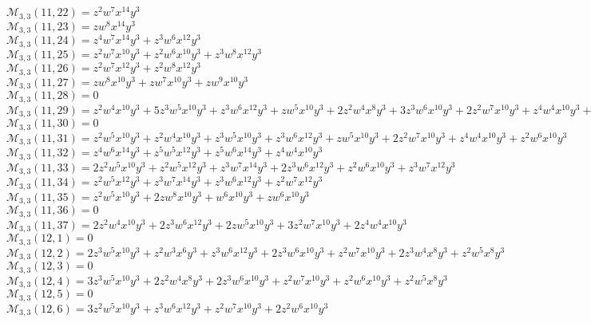 $\mathcal{M}_{3,3}(11,22)=z^2w^7x^{14}y^3$\\
$\mathcal{M}_{3,3}(11,23)=zw^8x^{14}y^3$\\
$\mathcal{M}_{3,3}(11,24)=z^4w^7x^{14}y^3+z^3w^6x^{12}y^3$\\
$\mathcal{M}_{3,3}(11,25)=z^2w^7x^{10}y^3+z^2w^6x^{10}y^3+z^3w^8x^{12}y^3$\\
$\mathcal{M}_{3,3}(11,26)=z^2w^7x^{12}y^3+z^2w^8x^{12}y^3$\\
$\mathcal{M}_{3,3}(11,27)=zw^8x^{10}y^3+zw^7x^{10}y^3+zw^9x^{10}y^3$\\
$\mathcal{M}_{3,3}(11,28)=0$\\
$\mathcal{M}_{3,3}(11,29)=z^2w^4x^{10}y^3+5z^3w^5x^{10}y^3+z^3w^6x^{12}y^3+zw^5x^{10}y^3+2z^2w^4x^8y^3+3z^3w^6x^{10}y^3+2z^2w^7x^{10}y^3+z^4w^4x^{10}y^3+z^2w^5x^8y^3$\\
$\mathcal{M}_{3,3}(11,30)=0$\\
$\mathcal{M}_{3,3}(11,31)=z^2w^5x^{10}y^3+z^2w^4x^{10}y^3+z^3w^5x^{10}y^3+z^3w^6x^{12}y^3+zw^5x^{10}y^3+2z^2w^7x^{10}y^3+z^4w^4x^{10}y^3+z^2w^6x^{10}y^3$\\
$\mathcal{M}_{3,3}(11,32)=z^4w^6x^{14}y^3+z^5w^5x^{12}y^3+z^5w^6x^{14}y^3+z^4w^4x^{10}y^3$\\
$\mathcal{M}_{3,3}(11,33)=2z^2w^5x^{10}y^3+z^2w^5x^{12}y^3+z^3w^7x^{14}y^3+2z^3w^6x^{12}y^3+z^2w^6x^{10}y^3+z^3w^7x^{12}y^3$\\
$\mathcal{M}_{3,3}(11,34)=z^2w^5x^{12}y^3+z^3w^7x^{14}y^3+z^3w^6x^{12}y^3+z^2w^7x^{12}y^3$\\
$\mathcal{M}_{3,3}(11,35)=z^2w^5x^{10}y^3+2zw^8x^{10}y^3+w^6x^{10}y^3+zw^6x^{10}y^3$\\
$\mathcal{M}_{3,3}(11,36)=0$\\
$\mathcal{M}_{3,3}(11,37)=2z^2w^4x^{10}y^3+2z^3w^6x^{12}y^3+2zw^5x^{10}y^3+3z^2w^7x^{10}y^3+2z^4w^4x^{10}y^3$\\
$\mathcal{M}_{3,3}(12,1)=0$\\
$\mathcal{M}_{3,3}(12,2)=2z^3w^5x^{10}y^3+z^2w^3x^6y^3+z^3w^6x^{12}y^3+2z^3w^6x^{10}y^3+z^2w^7x^{10}y^3+2z^3w^4x^8y^3+z^2w^5x^8y^3$\\
$\mathcal{M}_{3,3}(12,3)=0$\\
$\mathcal{M}_{3,3}(12,4)=3z^3w^5x^{10}y^3+2z^2w^4x^8y^3+2z^3w^6x^{10}y^3+z^2w^7x^{10}y^3+z^2w^6x^{10}y^3+z^2w^5x^8y^3$\\
$\mathcal{M}_{3,3}(12,5)=0$\\
$\mathcal{M}_{3,3}(12,6)=3z^2w^5x^{10}y^3+z^3w^6x^{12}y^3+z^2w^7x^{10}y^3+2z^2w^6x^{10}y^3$\\
